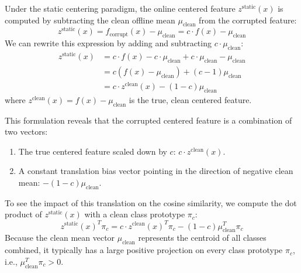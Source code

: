 \documentclass{article}
\theoremstyle{plain}
\theoremstyle{definition}
\theoremstyle{remark}
\begin{document}
Under the static centering paradigm, the online centered feature $z^{\text{static}}(x)$ is computed by subtracting the clean offline mean $\mu_{\text{clean}}$ from the corrupted feature:
\begin{equation}
  z^{\text{static}}(x) = f_{\text{corrupt}}(x) - \mu_{\text{clean}} = c \cdot f(x) - \mu_{\text{clean}}
\end{equation}
We can rewrite this expression by adding and subtracting $c \cdot \mu_{\text{clean}}$:
\begin{align}
  z^{\text{static}}(x) &= c \cdot f(x) - c \cdot \mu_{\text{clean}} + c \cdot \mu_{\text{clean}} - \mu_{\text{clean}} \nonumber \\
  &= c (f(x) - \mu_{\text{clean}}) + (c - 1) \mu_{\text{clean}} \nonumber \\
  &= c \cdot z^{\text{clean}}(x) - (1 - c) \mu_{\text{clean}}
\end{align}
where $z^{\text{clean}}(x) = f(x) - \mu_{\text{clean}}$ is the true, clean centered feature.

This formulation reveals that the corrupted centered feature is a combination of two vectors:
\begin{enumerate}
  \item The true centered feature scaled down by $c$: $c \cdot z^{\text{clean}}(x)$.
  \item A constant translation bias vector pointing in the direction of negative clean mean: $-(1 - c)\mu_{\text{clean}}$.
\end{enumerate}

To see the impact of this translation on the cosine similarity, we compute the dot product of $z^{\text{static}}(x)$ with a clean class prototype $\pi_c$:
\begin{equation}
  z^{\text{static}}(x)^T \pi_c = c \cdot z^{\text{clean}}(x)^T \pi_c - (1 - c) \mu_{\text{clean}}^T \pi_c
\end{equation}
Because the clean mean vector $\mu_{\text{clean}}$ represents the centroid of all classes combined, it typically has a large positive projection on every class prototype $\pi_c$, i.e., $\mu_{\text{clean}}^T \pi_c > 0$. 
\end{document}
